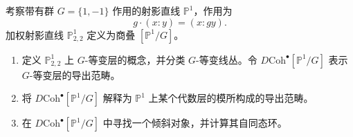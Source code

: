 \begin{exercise}\label{exer:weighted-projective-line-stack}
考察带有群 $G=\{1,-1\}$ 作用的射影直线 $\mathbb P^1$，作用为
\[
  g\cdot(x:y)=(x:gy).
\]
加权射影直线 $\mathbb P^1_{2,2}$ 定义为商叠 $[\mathbb P^1/G]$。
\begin{enumerate}[label=(\roman*)]
  \item 定义 $\mathbb P^1_{2,2}$ 上 $G$-等变层的概念，并分类 $G$-等变线丛。令 $D\mathrm{Coh}^{\bullet}[\mathbb P^1/G]$ 表示 $G$-等变层的导出范畴。
  \item 将 $D\mathrm{Coh}^{\bullet}[\mathbb P^1/G]$ 解释为 $\mathbb P^1$ 上某个代数层的模所构成的导出范畴。
  \item 在 $D\mathrm{Coh}^{\bullet}[\mathbb P^1/G]$ 中寻找一个倾斜对象，并计算其自同态环。
\end{enumerate}
\end{exercise}

